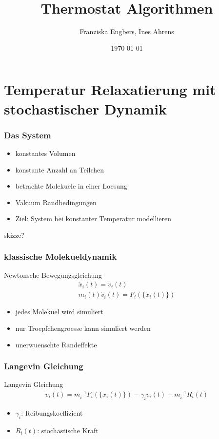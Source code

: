 \documentclass{beamer}
\title{Thermostat Algorithmen}
\author{Franziska Engbers, Ines Ahrens}
\date{\today}
\begin{document}
\maketitle
\frame{\tableofcontents[currentsection]}

\section{Temperatur Relaxatierung mit stochastischer Dynamik}

\begin{frame}
	\frametitle{Das System}
	\begin{itemize}
		\item konstantes Volumen
		\item konstante Anzahl an Teilchen
		\item betrachte Molekuele in einer Loesung
		\item Vakuum Randbedingungen
		\item Ziel: System bei konstanter Temperatur modellieren		
	\end{itemize}
	skizze?
\end{frame}

\begin{frame} 
  \frametitle{klassische Molekueldynamik}
  \begin{block}{Newtonsche Bewegungsgleichung} 
	\begin{align*}
	\dot{x}_i(t) = v_i(t) \\
	m_i(t) \dot{v}_i(t) = F_i(\{ x_i(t)\}) 
	\end{align*}
  \end{block}
  \begin{itemize}
  	\item jedes Molekuel wird simuliert
  	\item nur Troepfchengroesse kann simuliert werden 
  	\item unerwuenschte Randeffekte
  \end{itemize}
  \end{frame}
  
  \begin{frame}
  \frametitle{Langevin Gleichung}
  \begin{block}{Langevin Gleichung} %
	\begin{align*}
	\dot{v}_i(t)  = m_i^{-1} F_i(\{x_i(t)\}) - \gamma_i v_i(t) + m_i^{-1} R_i(t)
	\end{align*}
  \end{block}  
  \begin{itemize}
  	\item $\gamma_i$: Reibungskoeffizient 
  	\item $R_i(t)$: stochastische Kraft  
  \end{itemize}
  
\end{frame}
\end{document}
